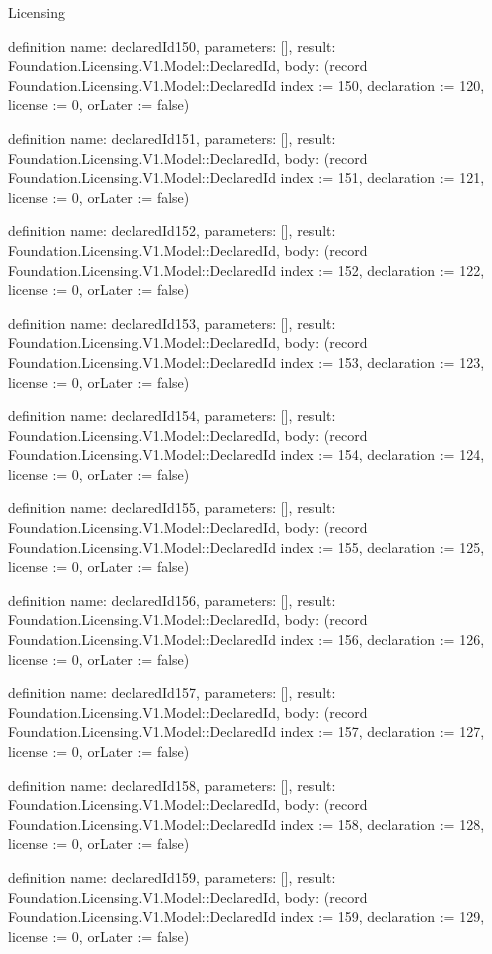 \begin{lexlean}{Licensing}
\begin{semanticmodule}
definition{
  name: declaredId150,
  parameters: [],
  result: Foundation.Licensing.V1.Model::DeclaredId,
  body: (record Foundation.Licensing.V1.Model::DeclaredId {index := 150, declaration := 120, license := 0, orLater := false})
}

definition{
  name: declaredId151,
  parameters: [],
  result: Foundation.Licensing.V1.Model::DeclaredId,
  body: (record Foundation.Licensing.V1.Model::DeclaredId {index := 151, declaration := 121, license := 0, orLater := false})
}

definition{
  name: declaredId152,
  parameters: [],
  result: Foundation.Licensing.V1.Model::DeclaredId,
  body: (record Foundation.Licensing.V1.Model::DeclaredId {index := 152, declaration := 122, license := 0, orLater := false})
}

definition{
  name: declaredId153,
  parameters: [],
  result: Foundation.Licensing.V1.Model::DeclaredId,
  body: (record Foundation.Licensing.V1.Model::DeclaredId {index := 153, declaration := 123, license := 0, orLater := false})
}

definition{
  name: declaredId154,
  parameters: [],
  result: Foundation.Licensing.V1.Model::DeclaredId,
  body: (record Foundation.Licensing.V1.Model::DeclaredId {index := 154, declaration := 124, license := 0, orLater := false})
}

definition{
  name: declaredId155,
  parameters: [],
  result: Foundation.Licensing.V1.Model::DeclaredId,
  body: (record Foundation.Licensing.V1.Model::DeclaredId {index := 155, declaration := 125, license := 0, orLater := false})
}

definition{
  name: declaredId156,
  parameters: [],
  result: Foundation.Licensing.V1.Model::DeclaredId,
  body: (record Foundation.Licensing.V1.Model::DeclaredId {index := 156, declaration := 126, license := 0, orLater := false})
}

definition{
  name: declaredId157,
  parameters: [],
  result: Foundation.Licensing.V1.Model::DeclaredId,
  body: (record Foundation.Licensing.V1.Model::DeclaredId {index := 157, declaration := 127, license := 0, orLater := false})
}

definition{
  name: declaredId158,
  parameters: [],
  result: Foundation.Licensing.V1.Model::DeclaredId,
  body: (record Foundation.Licensing.V1.Model::DeclaredId {index := 158, declaration := 128, license := 0, orLater := false})
}

definition{
  name: declaredId159,
  parameters: [],
  result: Foundation.Licensing.V1.Model::DeclaredId,
  body: (record Foundation.Licensing.V1.Model::DeclaredId {index := 159, declaration := 129, license := 0, orLater := false})
}


\end{semanticmodule}
\end{lexlean}
